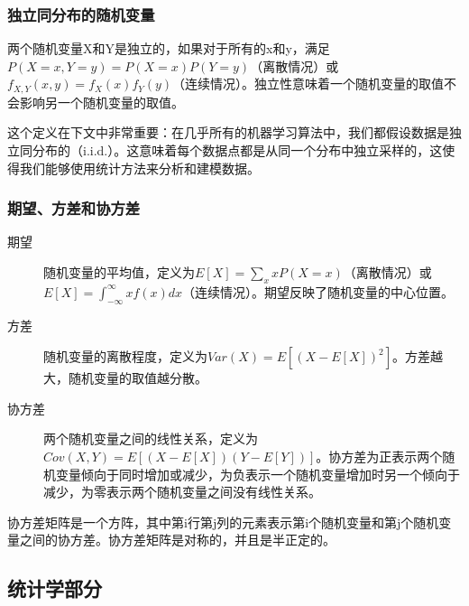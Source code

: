 \documentclass[aspectratio=1610]{ctexbeamer}
\begin{document}
\begin{frame}
    \frametitle{独立同分布的随机变量}

    两个随机变量X和Y是独立的，如果对于所有的x和y，满足$P(X=x, Y=y) = P(X=x)P(Y=y)$（离散情况）或$f_{X,Y}(x,y) = f_X(x)f_Y(y)$（连续情况）。独立性意味着一个随机变量的取值不会影响另一个随机变量的取值。

    这个定义在下文中非常重要：在几乎所有的机器学习算法中，我们都假设数据是独立同分布的（i.i.d.）。这意味着每个数据点都是从同一个分布中独立采样的，这使得我们能够使用统计方法来分析和建模数据。

\end{frame}

\begin{frame}
    \frametitle{期望、方差和协方差}

    \begin{description}
        \item[期望] 随机变量的平均值，定义为$E[X] = \sum_x x P(X=x)$（离散情况）或$E[X] = \int_{-\infty}^{\infty} x f(x) dx$（连续情况）。期望反映了随机变量的中心位置。
        \item[方差] 随机变量的离散程度，定义为$Var(X) = E[(X - E[X])^2]$。方差越大，随机变量的取值越分散。
        \item[协方差] 两个随机变量之间的线性关系，定义为$Cov(X,Y) = E[(X - E[X])(Y - E[Y])]$。协方差为正表示两个随机变量倾向于同时增加或减少，为负表示一个随机变量增加时另一个倾向于减少，为零表示两个随机变量之间没有线性关系。
    \end{description}

    \vspace{1em}
    \pause

    协方差矩阵是一个方阵，其中第i行第j列的元素表示第i个随机变量和第j个随机变量之间的协方差。协方差矩阵是对称的，并且是半正定的。

\end{frame}

\subsection{统计学部分}
\end{document}

